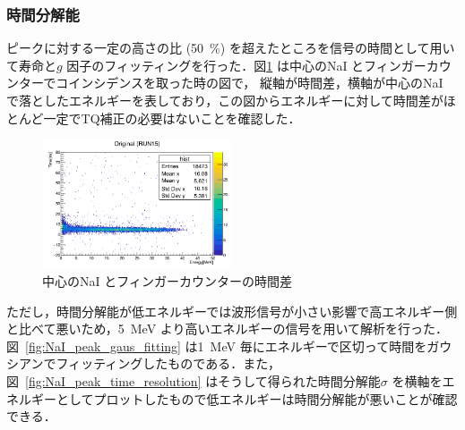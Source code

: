
\subsubsection{時間分解能}
ピークに対する一定の高さの比 (50~\%) を超えたところを信号の時間として用いて寿命と$g$ 因子のフィッティングを行った．図\ref{fig:Original} は中心のNaI とフィンガーカウンターでコインシデンスを取った時の図で， 縦軸が時間差，横軸が中心のNaI で落としたエネルギーを表しており，この図からエネルギーに対して時間差がほとんど一定でTQ補正の必要はないことを確認した．

\begin{figure}[H]%
\centering
\includegraphics[width  = 0.5\textwidth]{figure/mino/Original.png}
\caption{中心のNaI とフィンガーカウンターの時間差}
\label{fig:Original}
\end{figure}

ただし，時間分解能が低エネルギーでは波形信号が小さい影響で高エネルギー側と比べて悪いため，5~MeV より高いエネルギーの信号を用いて解析を行った．図~\ref{fig:NaI_peak_gaus_fitting} は1~MeV 毎にエネルギーで区切って時間をガウシアンでフィッティングしたものである．また，図~\ref{fig:NaI_peak_time_resolution} はそうして得られた時間分解能$\sigma$ を横軸をエネルギーとしてプロットしたもので低エネルギーは時間分解能が悪いことが確認できる．

